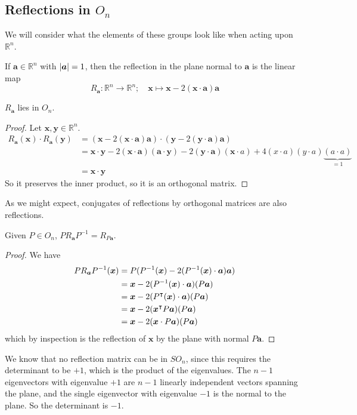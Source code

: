 \documentclass{article}
\begin{document}
	\subsection{Reflections in $O_n$}
	We will consider what the elements of these groups look like when acting upon $\mathbb R^n$.
	\begin{definition}
		If $\bm a \in \mathbb R^n$ with $\abs{\bm a} = 1$, then the reflection in the plane normal to $\bm a$ is the linear map
		\[ R_{\bm a} \colon \mathbb R^n \to \mathbb R^n;\quad \bm x \mapsto \bm x - 2 (\bm x \cdot \bm a) \bm a \]
	\end{definition}
	\begin{lemma}
		$R_{\bm a}$ lies in $O_n$.
	\end{lemma}
	\begin{proof}
		Let $\bm x, \bm y \in \mathbb R^n$.
		\begin{align*}
			R_{\bm a}(\bm x) \cdot R_{\bm a}(\bm y) &= (\bm x - 2 (\bm x \cdot \bm a) \bm a) \cdot (\bm y - 2 (\bm y \cdot \bm a) \bm a) \\
			&= \bm x \cdot \bm y - 2(\bm x \cdot \bm a)(\bm a \cdot \bm y) - 2(\bm y\cdot \bm a)(\bm x \cdot a) + 4(x\cdot a)(y \cdot a)\underbrace{(a \cdot a)}_{=1} \\
			&= \bm x \cdot \bm y
		\end{align*}
		So it preserves the inner product, so it is an orthogonal matrix.
	\end{proof}
	As we might expect, conjugates of reflections by orthogonal matrices are also reflections.
	\begin{lemma}
		Given $P \in O_n$, $PR_{\bm a}P^{-1} = R_{P\bm a}$.
	\end{lemma}
	\begin{proof}
		We have
		\begin{align*}
			PR_{\bm a}P^{-1}(\bm x) &= P(P^{-1}(\bm x) - 2 (P^{-1}(\bm x) \cdot \bm a) \bm a) \\
			&= \bm x - 2(P^{-1}(\bm x)\cdot\bm a)(P\bm a) \\
			&= \bm x - 2(P^\intercal (\bm x)\cdot\bm a)(P\bm a) \\
			&= \bm x - 2(\bm x^\intercal P \bm a)(P\bm a) \\
			&= \bm x - 2(\bm x \cdot P\bm a)(P\bm a)
		\end{align*}
		which by inspection is the reflection of $\bm x$ by the plane with normal $P\bm a$.
	\end{proof}
	We know that no reflection matrix can be in $SO_n$, since this requires the determinant to be $+1$, which is the product of the eigenvalues. The $n-1$ eigenvectors with eigenvalue $+1$ are $n-1$ linearly independent vectors spanning the plane, and the single eigenvector with eigenvalue $-1$ is the normal to the plane. So the determinant is $-1$.
\end{document}
